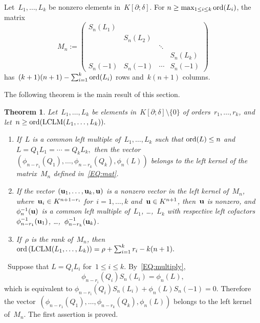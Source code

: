 \documentclass{sig-alt-full}
\def\myproof{\noindent{\sc Proof.}~}
\newcommand{\pa} { \partial}
\newcommand{\vu} { {\bf u}}
\newcommand{\ord} { {\rm ord}}
\newcommand{\lclm} { {\rm LCLM}}
\newtheorem{theorem}{Theorem}
\begin{document}
Let~$L_1, \ldots, L_k$ be nonzero elements in~$K[\pa; \delta]$.
For $n \ge \max_{1 \le i \le k} \ord(L_i)$, the  matrix
\begin{equation} \label{EQ:mat}
 M_n := \left(
\begin{array}{cccc}
S_n(L_1) &    &  &   \\
         & S_n(L_2) &  & \\
         &  &  \ddots &  \\
         &  &         & S_n(L_k) \\
S_{n}(-1) & S_{n}(-1) & \cdots & S_{n}(-1)
\end{array}\right)
\end{equation}
has~$(k+1)(n+1)- \sum_{i=1}^k \ord(L_i)$ rows and~$k(n+1)$ columns.

\smallskip The following theorem is the main result of this section.
\begin{theorem} \label{TH:mat}
Let~$L_1, \ldots, L_k$ be  elements in~$K[\pa; \delta] \setminus \{ 0\}$ of  orders~$r_1,  \ldots, r_k$,
and let~$n \geq \ord(\lclm(L_1, \ldots, L_k)).$
\begin{enumerate}
\item[(i)]
If~$L$ is a common left multiple of~$L_1, \ldots, L_k$ such that $\ord(L) \le n$ and 
$L=Q_1L_1=\cdots=Q_kL_k,$
then the vector~$\left(\phi_{n-r_1}(Q_1), \ldots, \phi_{n-r_k}(Q_k), \phi_n(L) \right)$
belongs to the left kernel of the matrix~$M_n$ defined in~\eqref{EQ:mat}.
\item[(ii)] If the vector~$(\vu_1, \ldots, \vu_k, \vu)$ is a nonzero vector in the left kernel of~$M_n$,
where~$\vu_i \in K^{n+1-r_i}$ for~$i=1, \ldots, k$ and~$\vu \in K^{n+1}$, then~$\vu$ is nonzero,
and~$\phi_n^{-1}(\vu)$ is a common
left multiple of~$L_1$, \ldots,~$L_k$ with respective left cofactors~$\phi_{n-r_1}^{-1}(\vu_1)$,
\ldots,~$\phi_{n-r_k}^{-1}(\vu_k)$.
\item[(iii)] If~$\rho$ is the rank of~$M_n$, then\\
$ \ord \left( \lclm(L_1, \ldots, L_k) \right) = \rho   + \sum_{i=1}^k r_i - k(n+1). $
\end{enumerate}
\end{theorem}
\myproof Suppose that $L=Q_iL_i$ for~$1 \le i \le k$.
By~\eqref{EQ:multiply},
\[ \phi_{n-r_i}(Q_i) S_n(L_i) = \phi_n(L), \]
which is equivalent to
$ \phi_{n-r_i}(Q_i) S_n(L_i) + \phi_n(L) S_n(-1) = 0. $
Therefore the vector~$(\phi_{n-r_1}(Q_1), \ldots, \phi_{n-r_k}(Q_k), \phi_n(L))$ belongs to the left kernel of~$M_n$.
The first assertion is proved.
\end{document}

